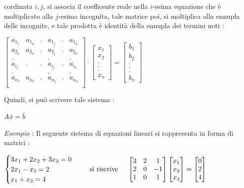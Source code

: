 \documentclass[12pt, letterpaper]{article}
\begin{document}
cordinata \(i,j\), si associa il coefficente reale nella \(i\)-esima equazione che è moltiplicato 
alla \(j\)-esima incognita, tale matrice poi, si moltiplica alla ennupla delle incognite, e tale prodotta è identità 
della ennupla dei termini noti :\begin{center}
    \(\begin{bmatrix}
        a_{1_1}&a_{1_2}&.&a_{1_j}&.& a_{1_n}\\
        a_{2_1}&a_{2_2}& .&a_{2_j}&.&a_{2_n}\\
        .&& &.&&.\\
        a_{i_1}&.& .&a_{ i_j}&.&a_{ i_n}\\
        .&& &.&&.\\
        a_{n_1}&a_{n_2}&.&a_{n_j}&.& a_{n_n}\\
    \end{bmatrix}\cdot 
    \begin{bmatrix}
        x_1\\x_2\\.\\.\\.\\x_n
    \end{bmatrix}= \begin{bmatrix}
        b_1\\b_2\\.\\.\\.\\b_n
    \end{bmatrix}\)
\end{center}
Quindi, si può scrivere tale sistema : \begin{center}
    \(A\bar x=\bar b\)
\end{center}
\textit{Esempio} : Il seguente sistema di equazioni lineari si rappresenta in forma di matrici : 
\begin{center}
    \(\begin{cases}
        3x_1+2x_2+3x_3=0\\
        2x_1-x_3=2\\
        x_1+x_3=4
    \end{cases}\text{\hphantom{aa} si riscrive \hphantom{aa}} \begin{bmatrix}
        3&2&1\\
        2&0&-1\\
        1&0&1
    \end{bmatrix}\begin{bmatrix}
        x_1\\x_2\\x_3
    \end{bmatrix}=\begin{bmatrix}
        0\\2\\4
    \end{bmatrix}\)
\end{center}
\end{document}
